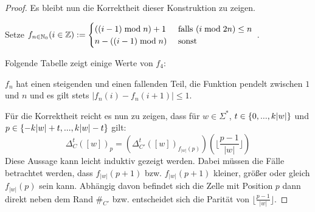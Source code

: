 \begin{proof}
    Es bleibt nun die Korrektheit dieser Konstruktion zu zeigen.
    
    Setze $f_{n \in \mathbb{N}_0}(i \in \mathbb{Z}) :=
    \begin{cases} 
        ((i - 1) \; \mathrm{mod} \; n) + 1  & \textrm{ falls } (i \; \mathrm{mod} \; 2n) \leq n \\
        n - ((i - 1) \; \mathrm{mod} \; n)  & \textrm{ sonst}
    \end{cases}$
    .
    \newline
    
    Folgende Tabelle zeigt einige Werte von $f_4$:
    \begin{center}
    \end{center}
    
    $f_n$ hat einen steigenden und einen fallenden Teil, die Funktion pendelt zwischen $1$ und $n$
    und es gilt stets $|f_n(i) - f_n(i+1)| \leq 1$.
    
    Für die Korrektheit reicht es nun zu zeigen, dass für $w \in \Sigma^*$, $t \in \{ {0, ..., k|w|} \}$ und $p \in \{ {-k|w|+t, ..., k|w|-t} \}$ gilt:
    \[
        \Delta_C^t([w])_p
            = (\Delta_{C'}^t([w])_{f_{|w|}(p)})(\lfloor \frac{p - 1}{|w|} \rfloor)
    \]
    Diese Aussage kann leicht induktiv gezeigt werden.
    Dabei müssen die Fälle betrachtet werden,
    dass $f_{|w|}(p+1)$ \acs{bzw.} $f_{|w|}(p+1)$
    kleiner, größer oder gleich $f_{|w|}(p)$ sein kann.
    Abhängig davon befindet sich die Zelle mit Position $p$ dann direkt neben dem Rand $\#_{C'}$ \acs{bzw.}
    entscheidet sich die Parität von $\lfloor \frac{p - 1}{|w|} \rfloor$.
    
    \begin{comment}
    $P_{t \in \Nz, n \in \N} := \finset{-kn+t, ..., kn-t}$.
    
        Sei $w \in \Sigma^*$.
        Beweis der Behauptung durch Induktion über $t$.

        Sei $t = 0$, $p \in \finset{1, ..., |w|}$.
        Dann $\Delta_{C'}^0([w])_p = w_p
        = \phi(w_p)(0)
        = (\Delta_{C'}^t([w])_{p})(0)
        = (\Delta_{C'}^t([w])_{f_{|w|}(p)})(\lfloor \frac{p - 1}{|w|} \rfloor)$.
        Sei nun $p \in P_{0,|w|} \setminus \finset{1, ..., |w|}$.
        Dann $\lfloor \frac{p - 1}{|w|} \rfloor \in K \setminus \finset{0}$ und
        $\Delta_{C'}^0([w])_p = \#_C =
        (\Delta_{C'}^t([w])_{f_{|w|}(p)})(\lfloor \frac{p - 1}{|w|} \rfloor)$.
    
    
        Sei $1 \leq t \leq k|w|$.
        Dann gilt das auch, ist aber mühselig. Am liebsten
        würde ich ja einen formalen, Computer-gestützten Beweis führen...
    \end{comment}
\end{proof}


